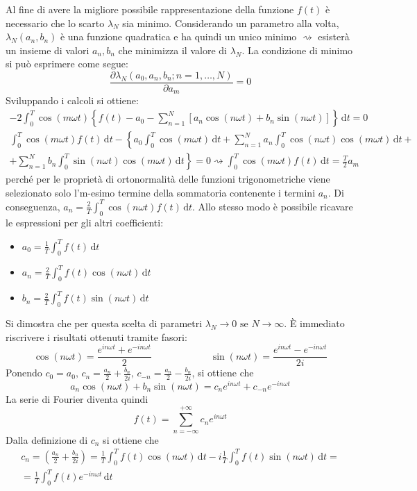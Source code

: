 Al fine di avere la migliore possibile rappresentazione della funzione \(f(t)\) è necessario che lo scarto \(\lambda _N\) sia minimo. Considerando un parametro alla volta, \(\lambda _N(a_n, b_n)\) è una funzione quadratica e ha quindi un unico minimo \(\rightsquigarrow \) esisterà un insieme di valori \(a_n, b_n\) che minimizza il valore di \(\lambda _N\). La condizione di minimo si può esprimere come segue:
\[
	\frac{\partial \lambda _N (a_0, a_n,b_n;n=1,\dots ,N)}{\partial a_m}=0 
\]
Sviluppando i calcoli si ottiene:
\begin{gather*}
	-2\int_{0}^{T} \cos (m \omega t) \left\{ f(t) - a_{0} - \sum_{n=1}^{N}[a_n \cos (n \omega t) + b_n \sin (n \omega t)]   \right\} \,\mathrm{d}t = 0\\
	\int_{0}^{T} \cos (m \omega t) f(t) \,\mathrm{d}t - \left\{a_0 \int_{0}^{T} \cos (m \omega t) \,\mathrm{d}t + \sum_{n=1}^{N} a_n \int_{0}^{T} \cos (n \omega t) \cos (m \omega t) \,\mathrm{d}t +\right.\\
	+ \left. \sum_{n=1}^{N} b_n \int_{0}^{T} \sin (n \omega t) \cos (m \omega t) \,\mathrm{d}t\right\} = 0
	\rightsquigarrow \int_{0}^{T} \cos (m \omega t) f(t) \,\mathrm{d}t = \frac{T}{2}a_m
\end{gather*}
perché per le proprietà di ortonormalità delle funzioni trigonometriche viene selezionato solo l'm-esimo termine della sommatoria contenente i termini \(a_n\).
Di conseguenza, \(a_n = \frac{2}{T} \int_{0}^{T} \cos (n \omega t) f(t) \,\mathrm{d}t \). Allo stesso modo è possibile ricavare le espressioni per gli altri coefficienti:
\begin{itemize}
	
	\item \(a_0 = \frac{1}{T} \int_{0}^{T} f(t) \,\mathrm{d}t \)
	\item \(a_n = \frac{2}{T} \int_{0}^{T} f(t) \cos (n \omega t) \,\mathrm{d}t \)
	\item \(b_n = \frac{2}{T} \int_{0}^{T} f(t) \sin (n \omega t) \,\mathrm{d}t \)   
\end{itemize}
Si dimostra che per questa scelta di parametri \(\lambda _N \to 0 \text{ se } N \to \infty \).
È immediato riscrivere i risultati ottenuti tramite fasori:
\[
	\cos (n \omega t) = \frac{e^{in \omega t} + e^{-in \omega t} }{2}
	\hspace{1in}
	\sin (n \omega t) = \frac{e^{in \omega t} - e^{-in \omega t}  }{2i}
\]
Ponendo \(c_0 = a_0 \text{, } c_n = \frac{a_n}{2} + \frac{b_n}{2i} \text{, } c_{-n} = \frac{a_n}{2} - \frac{b_n}{2i}  \), si ottiene che
\[
	a_n \cos (n \omega t) + b_n \sin (n \omega t) = c_n e^{in \omega t} + c_{-n} e^{-in \omega t}
\]
La serie di Fourier diventa quindi
\[
	f(t) = \sum_{n=-\infty}^{+\infty} c_n e^{in \omega t}
\]
Dalla definizione di \(c_n\) si ottiene che
\begin{gather*}
	c_n = \left(\frac{a_n}{2}+\frac{b_n}{2i}\right) = \frac{1}{T} \int_{0}^{T} f(t) \cos (n \omega t) \,\mathrm{d}t - i \frac{1}{T} \int_{0}^{T} f(t) \sin (n \omega t) \,\mathrm{d}t =\\
	= \frac{1}{T} \int_{0}^{T} f(t) e^{-in \omega t} \,\mathrm{d}t 
\end{gather*}

